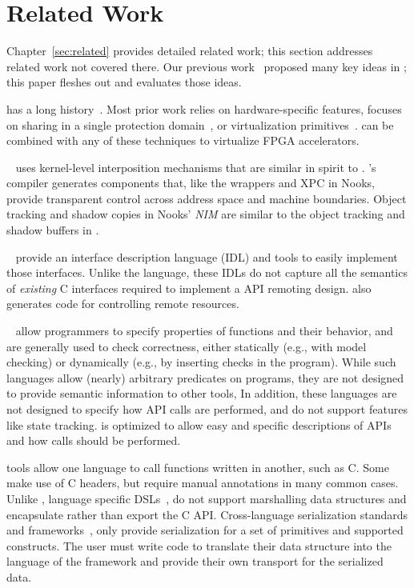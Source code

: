 \section{Related Work}
\label{s:related}

Chapter~\ref{sec:related} provides detailed related work; this section
addresses related work not covered there. Our previous work~\cite{hotos-ava}
proposed many key ideas in \AvA; this paper fleshes out and evaluates those
ideas.

has a long history~\cite{codezero,plessl2005zippy,
score,tartan06asplos,virtualRC,huang09fpgavirt,brant2012zuma,rcmw,
intermediate-fabrics}. Most prior work relies on hardware-specific features,
focuses on sharing in a single protection domain~\cite{amorphos}, or
virtualization primitives~\cite{cascade}. \AvA can be combined with any of
these techniques to virtualize FPGA accelerators.

~\cite{nooks} uses kernel-level interposition
mechanisms that are similar in spirit to \AvA. \AvA's compiler generates
components that, like the wrappers and XPC in Nooks, provide transparent
control across address space and machine boundaries. Object tracking and
shadow copies in Nooks' \emph{NIM} are similar to the object tracking and
shadow buffers in \AvA.

~\cite{grpc,thrift,corba,Yang1996} provide an
interface description language (IDL) and tools to easily implement those
interfaces. Unlike the \CAvA language, these IDLs do not capture all the
semantics of \emph{existing} C interfaces required to implement a \hira
API remoting design. \CAvA also generates code for controlling remote
resources.

~\cite{mssal} allow programmers
to specify properties of functions and their behavior, and are generally used
to check correctness, either statically (e.g., with model checking) or
dynamically (e.g., by inserting checks in the program). While such languages
allow (nearly) arbitrary predicates on programs, they are not designed to
provide semantic information to other tools, In addition, these languages are
not designed to specify how API calls are performed, and do not support
features like state tracking. \Lapis is optimized to allow easy and
specific descriptions of APIs and how calls should be performed.

 tools allow one language to call
functions written in another, such as C.
Some~\cite{swig} make use of C headers, but require manual annotations in many
common cases. Unlike \AvA, language specific DSLs~\cite{cython,jna},
do not support marshalling data structures and encapsulate rather than export
the C API.
Cross-language serialization standards and frameworks~\cite{protobuf, msgpack,
ecma404}, only provide serialization for a set of primitives and supported
constructs. The user must write code to translate their data structure into
the language of the framework and provide their own transport for the
serialized data.